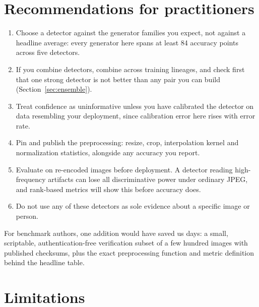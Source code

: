 \documentclass[3p,times,procedia]{elsarticle}
\begin{document}
\section{Recommendations for practitioners}
\label{sec:recommendations}

\begin{enumerate}
\item Choose a detector against the generator families you expect, not
against a headline average: every generator here spans at least 84
accuracy points across five detectors.
\item If you combine detectors, combine across training lineages, and
check first that one strong detector is not better than any pair you can
build (Section~\ref{sec:ensemble}).
\item Treat confidence as uninformative unless you have calibrated the
detector on data resembling your deployment, since calibration error here
rises with error rate.
\item Pin and publish the preprocessing: resize, crop, interpolation
kernel and normalization statistics, alongside any accuracy you report.
\item Evaluate on re-encoded images before deployment. A detector reading
high-frequency artifacts can lose all discriminative power under ordinary
JPEG, and rank-based metrics will show this before accuracy does.
\item Do not use any of these detectors as sole evidence about a specific
image or person.
\end{enumerate}

For benchmark authors, one addition would have saved us days: a small,
scriptable, authentication-free verification subset of a few hundred
images with published checksums, plus the exact preprocessing function and
metric definition behind the headline table.


\section{Limitations}
\label{sec:limitations}
\end{document}
